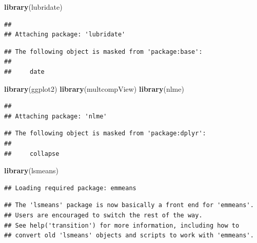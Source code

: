 \documentclass[12pt,]{article}
\newenvironment{Shaded}{\begin{snugshade}}{\end{snugshade}}
\newcommand{\KeywordTok}[1]{\textcolor[rgb]{0.13,0.29,0.53}{\textbf{#1}}}
\newcommand{\NormalTok}[1]{#1}
\begin{document}
\begin{Shaded}
\begin{Highlighting}[]
\KeywordTok{library}\NormalTok{(lubridate)}
\end{Highlighting}
\end{Shaded}

\begin{verbatim}
## 
## Attaching package: 'lubridate'
\end{verbatim}

\begin{verbatim}
## The following object is masked from 'package:base':
## 
##     date
\end{verbatim}

\begin{Shaded}
\begin{Highlighting}[]
\KeywordTok{library}\NormalTok{(ggplot2)}
\KeywordTok{library}\NormalTok{(multcompView)}
\KeywordTok{library}\NormalTok{(nlme)}
\end{Highlighting}
\end{Shaded}

\begin{verbatim}
## 
## Attaching package: 'nlme'
\end{verbatim}

\begin{verbatim}
## The following object is masked from 'package:dplyr':
## 
##     collapse
\end{verbatim}

\begin{Shaded}
\begin{Highlighting}[]
\KeywordTok{library}\NormalTok{(lsmeans)}
\end{Highlighting}
\end{Shaded}

\begin{verbatim}
## Loading required package: emmeans
\end{verbatim}

\begin{verbatim}
## The 'lsmeans' package is now basically a front end for 'emmeans'.
## Users are encouraged to switch the rest of the way.
## See help('transition') for more information, including how to
## convert old 'lsmeans' objects and scripts to work with 'emmeans'.
\end{verbatim}
\end{document}
